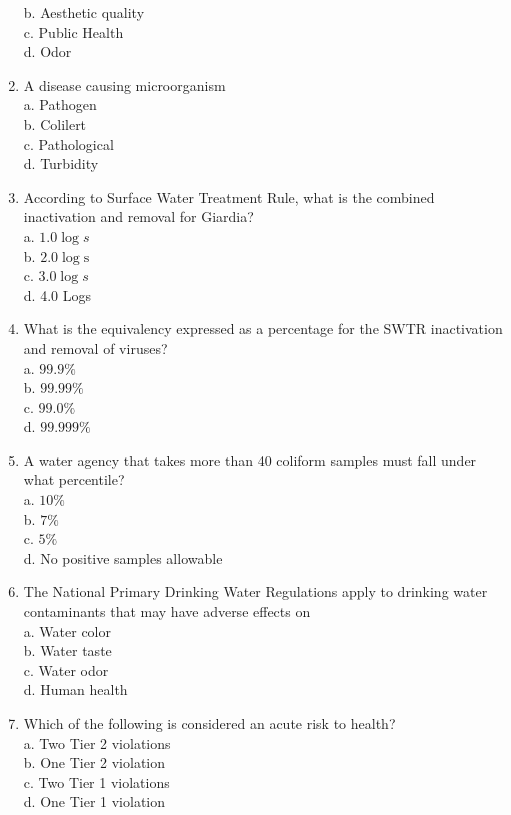 \begin{enumerate}
b. Aesthetic quality\\
c. Public Health\\
d. Odor\\
\item A disease causing microorganism\\
a. Pathogen\\
b. Colilert\\
c. Pathological\\
d. Turbidity\\
\item According to Surface Water Treatment Rule, what is the combined inactivation and removal for Giardia?\\
a. $1.0 \log s$\\
b. $2.0 \log \mathrm{s}$\\
c. $3.0 \log s$\\
d. 4.0 Logs\\
\item What is the equivalency expressed as a percentage for the SWTR inactivation and removal of viruses?\\
a. $99.9 \%$\\
b. $99.99 \%$\\
c. $99.0 \%$\\
d. $99.999 \%$\\
\item A water agency that takes more than 40 coliform samples must fall under what percentile?\\
a. $10 \%$\\
b. $7 \%$\\
c. $5 \%$\\
d. No positive samples allowable\\
\item The National Primary Drinking Water Regulations apply to drinking water contaminants that may have adverse effects on\\
a. Water color\\
b. Water taste\\
c. Water odor\\
d. Human health\\
\item Which of the following is considered an acute risk to health?\\
a. Two Tier 2 violations\\
b. One Tier 2 violation\\
c. Two Tier 1 violations\\
d. One Tier 1 violation\\

\end{enumerate}
